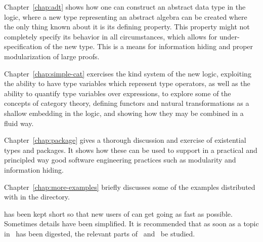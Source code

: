Chapter~\ref{chap:adt} shows how one can construct an abstract data
type in the \HOLW{} logic, where a new type representing an abstract
algebra can be created where the only thing known about it is its
defining property.  This property might not completely specify its
behavior in all circumstances, which allows for under-specification
of the new type. This is a means for information
hiding and proper modularization of large proofs.

Chapter~\ref{chap:simple-cat} exercises the kind system of the
new logic, exploiting the ability to have type variables which
represent type operators, as well as the ability to quantify
type variables over expressions, to explore some of the concepts
of category theory, defining functors and natural transformations
as a shallow embedding in the \HOLW{} logic, and showing how they 
may be combined in a fluid way.

Chapter~\ref{chap:package} gives a thorough discussion and
exercise of existential types and packages. It shows how these can
be used to support in a practical and principled way good
software engineering practices such as modularity and information
hiding.

Chapter~\ref{chap:more-examples} briefly discusses some of the
examples distributed with \holnw{} in the  directory.




\vspace{1cm}

\noindent \TUTORIAL{} has been kept short so that new users of \HOLW{} can get
going as fast as possible. Sometimes details have been simplified. It
is recommended that as soon as a topic in \TUTORIAL\ has been
digested, the relevant parts of \DESCRIPTION\ and \REFERENCE\ be
studied.

